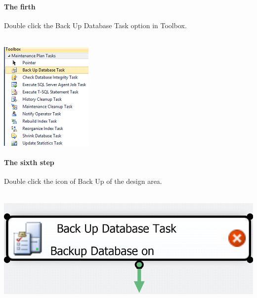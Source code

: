 \documentclass[english]{article}
\begin{document}
\paragraph{The firth} Double click the Back Up Database Task option in Toolbox.\\\\
\centerline{\includegraphics[scale=0.8]{administration/16}}
\paragraph{The sixth step} Double click the icon of Back Up of the design area.\\\\
\centerline{\includegraphics[scale=0.3]{administration/17}}
\end{document}
